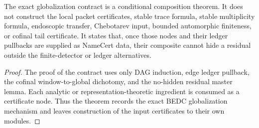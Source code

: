 \begin{theorem}
\label{thm:unified-reality-exact-globalization-boundary}
The exact globalization contract is a conditional composition theorem.
It does not construct the local packet certificates, stable trace
formula, stable multiplicity formula, endoscopic transfer, Chebotarev
input, bounded automorphic finiteness, or cofinal tail certificate. It
states that, once those nodes and their ledger pullbacks are supplied as
NameCert data, their composite cannot hide a residual outside the
finite-detector or ledger alternatives.
\end{theorem}
\begin{proof}
The proof of the contract uses only DAG induction, edge ledger
pullback, the cofinal window-to-global dichotomy, and the no-hidden
residual master lemma. Each analytic or representation-theoretic
ingredient is consumed as a certificate node. Thus the theorem records
the exact BEDC globalization mechanism and leaves construction of the
input certificates to their own modules.
\end{proof}
